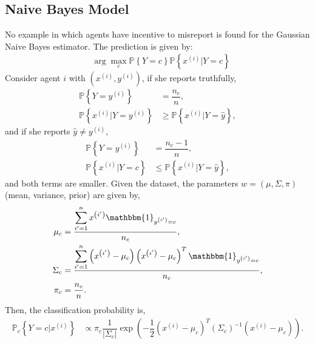 \documentclass{article}
\begin{document}
\subsection{Naive Bayes Model}
No example in which agents have incentive to misreport is found for the Gaussian Naive Bayes estimator.
\newline \newline
The prediction is given by:
\begin{align*}
&\arg\displaystyle\max_{c} \mathbb{P} \left\{Y = c\right\} \mathbb{P} \left\{x^{\left(i\right)} | Y = c\right\}
\end{align*}
Consider agent $i $ with $\left(x^{\left(i\right)}, y^{\left(i\right)}\right)$, if she reports truthfully,
\begin{align*}
\mathbb{P} \left\{Y = y^{\left(i\right)}\right\} &= \dfrac{n_{c}}{n},
\\ \mathbb{P} \left\{x^{\left(i\right)} | Y = y^{\left(i\right)}\right\} &\geq  \mathbb{P} \left\{x^{\left(i\right)} | Y = \hat{y}\right\},
\end{align*}
and if she reports $\hat{y} \neq  y^{\left(i\right)}$,
\begin{align*}
\mathbb{P} \left\{Y = y^{\left(i\right)}\right\} &= \dfrac{n_{c} - 1}{n},
\\ \mathbb{P} \left\{x^{\left(i\right)} | Y = c\right\} &\leq  \mathbb{P} \left\{x^{\left(i\right)} | Y = \hat{y}\right\},
\end{align*}
and both terms are smaller.
\newline \newline
Given the dataset, the parameters $w  = \left(\mu, \Sigma, \pi\right)$ (mean, variance, prior) are given by,
\begin{align*}
\mu_{c} &= \dfrac{\displaystyle\sum_{i'=1}^{n} x^{\left(i'\right)} \mathbbm{1}_{y^{\left(i'\right)} = c}}{n_{c}},
\\ \Sigma_{c} &= \dfrac{\displaystyle\sum_{i'=1}^{n} \left(x^{\left(i'\right)} - \mu_{c}\right) \left(x^{\left(i'\right)} - \mu_{c}\right)^{T} \mathbbm{1}_{y^{\left(i'\right)} = c}}{n_{c}},
\\ \pi_{c} &= \dfrac{n_{c}}{n} .
\end{align*}
Then, the classification probability is,
\begin{align*}
\mathbb{P}_{c} \left\{Y = c | x^{\left(i\right)}\right\} &\propto \pi_{c} \dfrac{1}{\left| \Sigma_{c} \right|} \exp\left(- \dfrac{1}{2} \left(x^{\left(i\right)} - \mu_{c}\right)^{T} \left(\Sigma_{c}\right)^{-1} \left(x^{\left(i\right)} - \mu_{c}\right)\right).
\end{align*}
\end{document}

